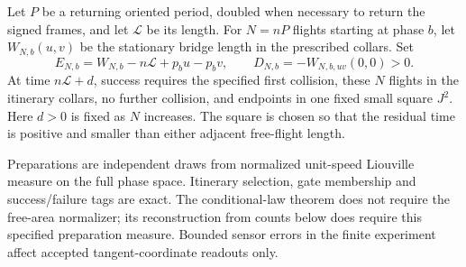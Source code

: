 Let $P$ be a returning oriented period, doubled when necessary to return
the signed frames, and let $\mathcal L$ be its length.  For $N=nP$
flights starting at phase $b$, let $W_{N,b}(u,v)$ be the stationary
bridge length in the prescribed collars.  Set
\[
 E_{N,b}=W_{N,b}-n\mathcal L+p_bu-p_bv,\qquad
 D_{N,b}=-W_{N,b,uv}(0,0)>0.
\]
At time $n\mathcal L+d$, success requires the specified first collision,
these $N$ flights in the itinerary collars, no further collision, and
endpoints in one fixed small square $J^2$.  Here $d>0$ is fixed as
$N$ increases.  The square is chosen so that the residual time is
positive and smaller than either adjacent free-flight length.

Preparations are independent draws from normalized unit-speed Liouville
measure on the full phase space.  Itinerary selection, gate membership
and success/failure tags are exact.  The conditional-law theorem does
not require the free-area normalizer; its reconstruction from counts
below does require this specified preparation measure.  Bounded sensor
errors in the finite experiment affect accepted tangent-coordinate
readouts only.

